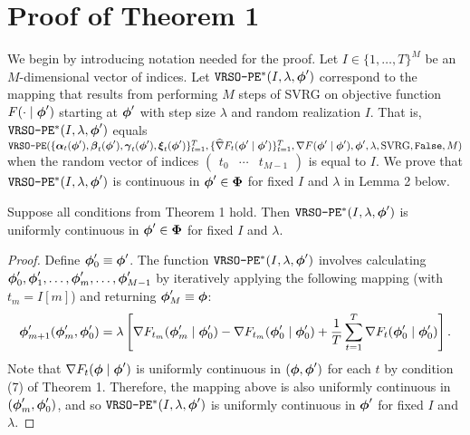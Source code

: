 \section{Proof of Theorem 1}

We begin by introducing notation needed for the proof. Let $I \in \{1,\ldots,T\}^M$ be an $M$-dimensional vector of indices. Let $\texttt{VRSO-PE}^*(I,\lambda,\boldsymbol{\phi}')$ correspond to the mapping that results from performing $M$ steps of SVRG on objective function $F(\cdot \mid \boldsymbol{\phi}')$ starting at $\boldsymbol{\phi}'$ with step size $\lambda$ and random realization $I$. That is, $\texttt{VRSO-PE}^*(I,\lambda,\boldsymbol{\phi}')$ equals $\texttt{VRSO-PE}(\{\boldsymbol{\alpha}_t(\boldsymbol{\phi}'),\boldsymbol{\beta}_t(\boldsymbol{\phi}'),\boldsymbol{\gamma}_t(\boldsymbol{\phi}'),\boldsymbol{\xi}_t(\boldsymbol{\phi}')\}_{t=1}^{T}, \{\widehat \nabla F_t(\boldsymbol{\phi}' \mid \boldsymbol{\phi}')\}_{t=1}^T, \nabla F(\boldsymbol{\phi}' \mid \boldsymbol{\phi}'), \boldsymbol{\phi}', \lambda, \text{SVRG}, \texttt{False}, M)$ when the random vector of indices $\begin{pmatrix} t_0 & \cdots & t_{M-1} \end{pmatrix}$ is equal to $I$. We prove that $\texttt{VRSO-PE}^*(I,\lambda,\boldsymbol{\phi}')$ is continuous in $\boldsymbol{\phi}' \in \boldsymbol{\Phi}$ for fixed $I$ and $\lambda$ in Lemma 2 below.

\begin{lemma}
    Suppose all conditions from Theorem 1 hold. Then $\texttt{VRSO-PE}^*(I,\lambda,\boldsymbol{\phi}')$ is uniformly continuous in $\boldsymbol{\phi}' \in \boldsymbol{\Phi}$ for fixed $I$ and $\lambda$.
\end{lemma}

\begin{proof}
    Define $\boldsymbol{\phi}'_0 \equiv \boldsymbol{\phi}'$. The function $\texttt{VRSO-PE}^*(I,\lambda,\boldsymbol{\phi}')$ involves calculating $\boldsymbol{\phi}'_0, \boldsymbol{\phi}'_1, \ldots, \boldsymbol{\phi}'_{m}, \ldots, \boldsymbol{\phi}'_{M-1}$ by iteratively applying the following mapping (with $t_m = I[m]$) and returning $\boldsymbol{\phi}'_M \equiv \boldsymbol{\phi}$:
    \begin{equation*}
        \boldsymbol{\phi}'_{m+1}(\boldsymbol{\phi}'_m,\boldsymbol{\phi}'_0) = \lambda \left[\nabla F_{t_m}(\boldsymbol{\phi}'_m \mid \boldsymbol{\phi}'_0) - \nabla F_{t_m}(\boldsymbol{\phi}'_0 \mid \boldsymbol{\phi}'_0) + \frac{1}{T}\sum_{t=1}^T\nabla F_{t}(\boldsymbol{\phi}'_0 \mid \boldsymbol{\phi}'_0) \right].
    \end{equation*}
    Note that $\nabla F_t(\boldsymbol{\phi} \mid \boldsymbol{\phi}')$ is uniformly continuous in $(\boldsymbol{\phi},\boldsymbol{\phi}')$ for each $t$ by condition (7) of Theorem 1. Therefore, the mapping above is also uniformly continuous in $(\boldsymbol{\phi}'_m,\boldsymbol{\phi}'_0)$, and so $\texttt{VRSO-PE}^*(I,\lambda,\boldsymbol{\phi}')$ is uniformly continuous in $\boldsymbol{\phi}'$ for fixed $I$ and $\lambda$.
\end{proof}

